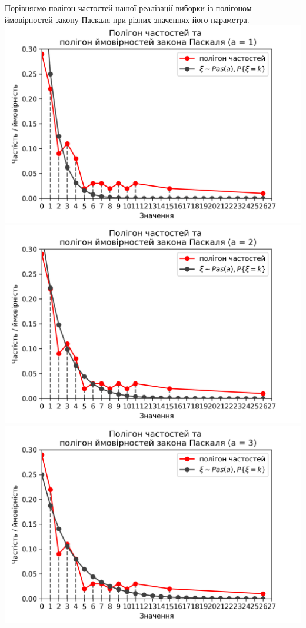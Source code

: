 \documentclass{article}
\begin{document}
Порівняємо полігон частостей нашої реалізації 
виборки із полігоном ймовірностей закону Паскаля при 
різних значеннях його параметра.
\newline
\includegraphics[scale = 0.8]{pol+pas1}
\newline
\includegraphics[scale = 0.8]{pol+pas2}
\newline
\includegraphics[scale = 0.8]{pol+pas3}
\end{document}
